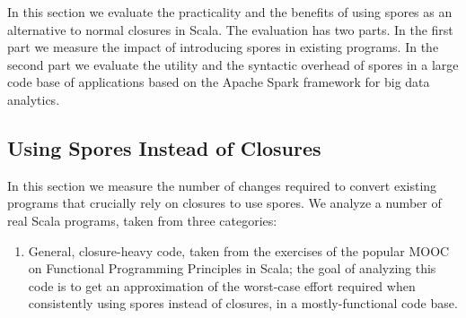 \documentclass[runningheads]{llncs}
\newcommand{\myrowcolour}{\rowcolor[gray]{0.925}}
\begin{document}
\begin{sloppypar}














In this section we evaluate the practicality and the benefits of using spores
as an alternative to normal closures in Scala. The evaluation has two parts.
In the first part we measure the impact of introducing spores in existing
programs. In the second part we evaluate the utility and the syntactic overhead
of spores in a large code base of applications based on the Apache Spark
framework for big data analytics.

\subsection{Using Spores Instead of Closures}

In this section we measure the number of changes required to convert existing
programs that crucially rely on closures to use spores. We analyze a number of
real Scala programs, taken from three categories:
\begin{enumerate}
\vspace{-1mm}
\item General, closure-heavy code, taken from the exercises of the popular MOOC on Functional Programming Principles in Scala; the goal of analyzing this code is to get an approximation of the worst-case effort required when consistently using spores instead of closures, in a mostly-functional code base.


\end{enumerate}
\end{sloppypar}
\end{document}
